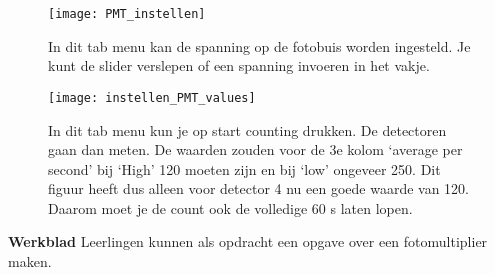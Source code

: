 \begin{figure}
    \centering
    \texttt{[image: PMT\_instellen]}
    \caption{In dit tab menu kan de spanning op de fotobuis worden ingesteld.
    Je kunt de slider verslepen of een spanning invoeren in het vakje.}
    \label{fig:PMT_instellen}
\end{figure}

\begin{figure}
    \centering
    \texttt{[image: instellen\_PMT\_values]}
    \caption{In dit tab menu kun je op start counting drukken. De detectoren gaan dan meten.
    De waarden zouden voor de 3e kolom `average per second' bij `High' 120 moeten zijn en bij `low' ongeveer 250.
    Dit figuur heeft dus alleen voor detector 4 nu een goede waarde van 120.
    Daarom moet je de count ook de volledige 60 s laten lopen.}
    \label{fig:instellen_PMT_values}

\end{figure}
\textbf{Werkblad}
Leerlingen kunnen als opdracht een opgave over een fotomultiplier maken.








